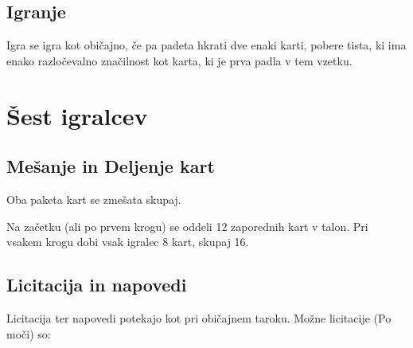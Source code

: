 \documentclass[a4paper, ]{report}
\begin{document}
\chapter{Igranje}

Igra se igra kot običajno, če pa padeta hkrati dve enaki karti, pobere tista, ki ima enako razločevalno značilnost kot karta, ki je prva padla v tem vzetku.

\part{Šest igralcev}

\chapter{Mešanje in Deljenje kart}

Oba paketa kart se zmešata skupaj.

Na začetku (ali po prvem krogu) se oddeli 12 zaporednih kart v talon. Pri vsakem krogu dobi vsak igralec 8 kart, skupaj 16.

\chapter{Licitacija in napovedi}

Licitacija ter napovedi potekajo kot pri običajnem taroku.
Možne licitacije (Po moči) so:
\end{document}
